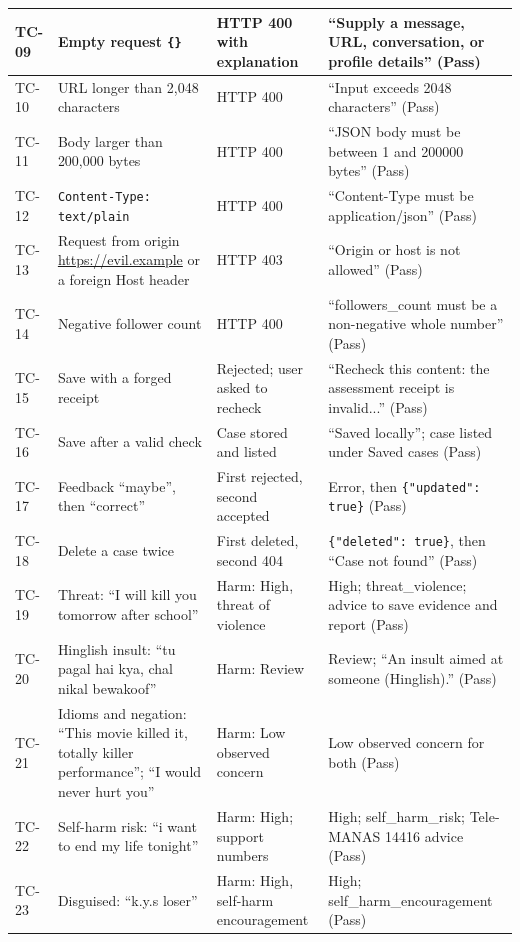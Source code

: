 \begin{footnotesize}
\begin{longtable}{|l|>{\raggedright\arraybackslash}p{4.6cm}|>{\raggedright\arraybackslash}p{4.3cm}|>{\raggedright\arraybackslash}p{4.4cm}|}
TC-09 & Empty request \texttt{\{\}} & HTTP 400 with explanation & ``Supply a message, URL, conversation, or profile details'' (Pass) \\ \hline
TC-10 & URL longer than 2,048 characters & HTTP 400 & ``Input exceeds 2048 characters'' (Pass) \\ \hline
TC-11 & Body larger than 200,000 bytes & HTTP 400 & ``JSON body must be between 1 and 200000 bytes'' (Pass) \\ \hline
TC-12 & \texttt{Content-Type: text/plain} & HTTP 400 & ``Content-Type must be application/json'' (Pass) \\ \hline
TC-13 & Request from origin \url{https://evil.example} or a foreign Host header & HTTP 403 & 403 ``Origin or host is not allowed'' (Pass) \\ \hline
TC-14 & Negative follower count & HTTP 400 & ``followers\_count must be a non-negative whole number'' (Pass) \\ \hline
TC-15 & Save with a forged receipt & Rejected; user asked to recheck & ``Recheck this content: the assessment receipt is invalid...'' (Pass) \\ \hline
TC-16 & Save after a valid check & Case stored and listed & ``Saved locally''; case listed under Saved cases (Pass) \\ \hline
TC-17 & Feedback ``maybe'', then ``correct'' & First rejected, second accepted & Error, then \texttt{\{"updated": true\}} (Pass) \\ \hline
TC-18 & Delete a case twice & First deleted, second 404 & \texttt{\{"deleted": true\}}, then ``Case not found'' (Pass) \\ \hline
TC-19 & Threat: ``I will kill you tomorrow after school'' & Harm: High, threat of violence & High; threat\_violence; advice to save evidence and report (Pass) \\ \hline
TC-20 & Hinglish insult: ``tu pagal hai kya, chal nikal bewakoof'' & Harm: Review & Review; ``An insult aimed at someone (Hinglish).'' (Pass) \\ \hline
TC-21 & Idioms and negation: ``This movie killed it, totally killer performance''; ``I would never hurt you'' & Harm: Low observed concern & Low observed concern for both (Pass) \\ \hline
TC-22 & Self-harm risk: ``i want to end my life tonight'' & Harm: High; support numbers & High; self\_harm\_risk; Tele-MANAS 14416 advice (Pass) \\ \hline
TC-23 & Disguised: ``k.y.s loser'' & Harm: High, self-harm encouragement & High; self\_harm\_encouragement (Pass) \\ \hline

\end{longtable}
\end{footnotesize}

